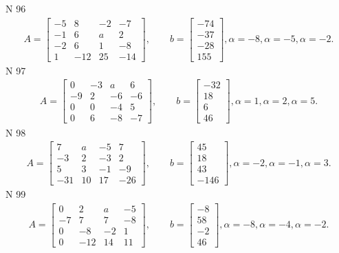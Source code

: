 \documentclass[11pt]{report}
\begin{document}
N 96
\begin{align*}
 A = \left[\begin{matrix}-5 & 8 & -2 & -7\\-1 & 6 & a & 2\\-2 & 6 & 1 & -8\\1 & -12 & 25 & -14\end{matrix}\right],
    \qquad b = \left[\begin{matrix}-74\\-37\\-28\\155\end{matrix}\right], \alpha = -8, \alpha = -5, \alpha = -2. 
 \end{align*}
N 97
\begin{align*}
 A = \left[\begin{matrix}0 & -3 & a & 6\\-9 & 2 & -6 & -6\\0 & 0 & -4 & 5\\0 & 6 & -8 & -7\end{matrix}\right],
    \qquad b = \left[\begin{matrix}-32\\18\\6\\46\end{matrix}\right], \alpha = 1, \alpha = 2, \alpha = 5. 
 \end{align*}
N 98
\begin{align*}
 A = \left[\begin{matrix}7 & a & -5 & 7\\-3 & 2 & -3 & 2\\5 & 3 & -1 & -9\\-31 & 10 & 17 & -26\end{matrix}\right],
    \qquad b = \left[\begin{matrix}45\\18\\43\\-146\end{matrix}\right], \alpha = -2, \alpha = -1, \alpha = 3. 
 \end{align*}
N 99
\begin{align*}
 A = \left[\begin{matrix}0 & 2 & a & -5\\-7 & 7 & 7 & -8\\0 & -8 & -2 & 1\\0 & -12 & 14 & 11\end{matrix}\right],
    \qquad b = \left[\begin{matrix}-8\\58\\-2\\46\end{matrix}\right], \alpha = -8, \alpha = -4, \alpha = -2. 
 \end{align*}
\end{document}
